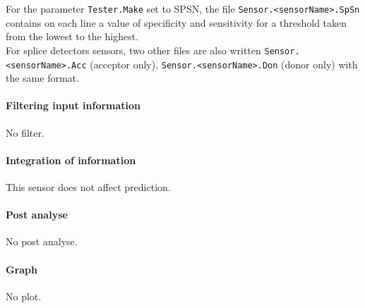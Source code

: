 For the parameter \texttt{Tester.Make} set to SPSN, the file \texttt{Sensor.<sensorName>.SpSn} contains on each line a value of specificity and sensitivity for a threshold 
taken from the lowest to the highest.\\ 
For splice detectors sensors, two other files are also written \texttt{Sensor.<sensorName>.Acc} (acceptor only), \texttt{Sensor.<sensorName>.Don} (donor only) with the same format.


\paragraph{Filtering input information}

No filter.

\paragraph{Integration of information}

This sensor does not affect prediction.

\paragraph{Post analyse}

No post analyse.

\paragraph{Graph}

No plot.

